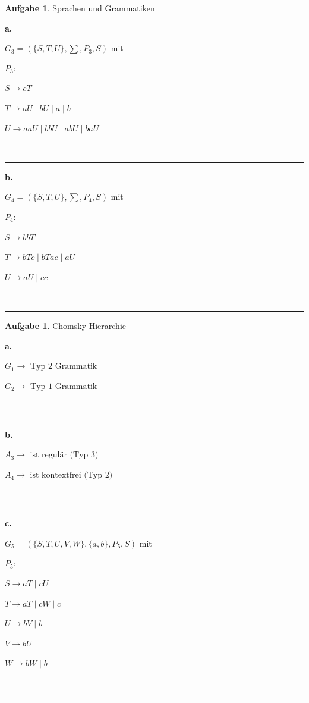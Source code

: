 \documentclass[10pt,leqno ]{article}
\theoremstyle{definition}
\newtheorem{problem}[theorem]{Aufgabe}
\newenvironment{solution}[1][L]{\begin{doublespace}\textbf{#1.}\quad }{\ \rule{0.5em}{0.5em}\end{doublespace}}
\begin{document}
\begin{problem}
    Sprachen und Grammatiken
\end{problem}

\begin{solution}[a]

    \( G_3 = ( \{ S,T,U \}, \sum, P_3, S ) \) mit 

    $P_3:$ 

    \( S \to cT \)

    \( T \to aU \mid bU \mid a \mid b \)

    \( U \to aaU \mid bbU \mid abU \mid baU \)

\end{solution}

\begin{solution}[b]

    \( G_4 = ( \{ S,T,U \}, \sum, P_4, S ) \) mit 

    $P_4:$ 

    \( S \to bbT \) 

    \( T \to bTc \mid bTac \mid aU \) 

    \( U \to aU \mid cc \) 
    
\end{solution}

\begin{problem}
    Chomsky Hierarchie
\end{problem}

\begin{solution}[a]
    
    \( G_1 \to \text{ Typ 2 Grammatik}\)

    \( G_2 \to \text{ Typ 1 Grammatik}\)

\end{solution}

\begin{solution}[b]

    \( A_3 \to \text{ ist regulär (Typ 3)} \)

    \( A_4 \to \text{ ist kontextfrei (Typ 2)} \)
    
\end{solution}

\begin{solution}[c]

    \( G_5 = ( \{ S,T,U,V,W \}, \{ a,b \}, P_5, S ) \) mit 

    $P_5:$ 

    \( S \to aT \mid cU \) 

    \( T \to aT \mid cW \mid c \) 

    \( U \to bV \mid b \)

    \( V \to bU \)

    \( W \to bW \mid b \)

    
\end{solution}
\end{document}
